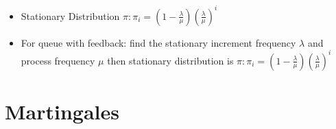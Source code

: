 \documentclass[a4paper]{article}
\begin{document}
\begin{itemize}
\begin{itemize}
\begin{figure} [H]
            \end{figure}
                \begin{itemize}
                    \item Stationary Distribution $\pi: \pi_i = (1-\frac{\lambda}{\mu})(\frac{\lambda}{\mu})^i$
                    \item For queue with feedback: find the stationary increment frequency $\lambda$ and process frequency $\mu$ then stationary distribution is $\pi: \pi_i = (1-\frac{\lambda}{\mu})(\frac{\lambda}{\mu})^i$
                \end{itemize}
        \end{itemize}
\end{itemize}

\section{Martingales}
\end{document}

